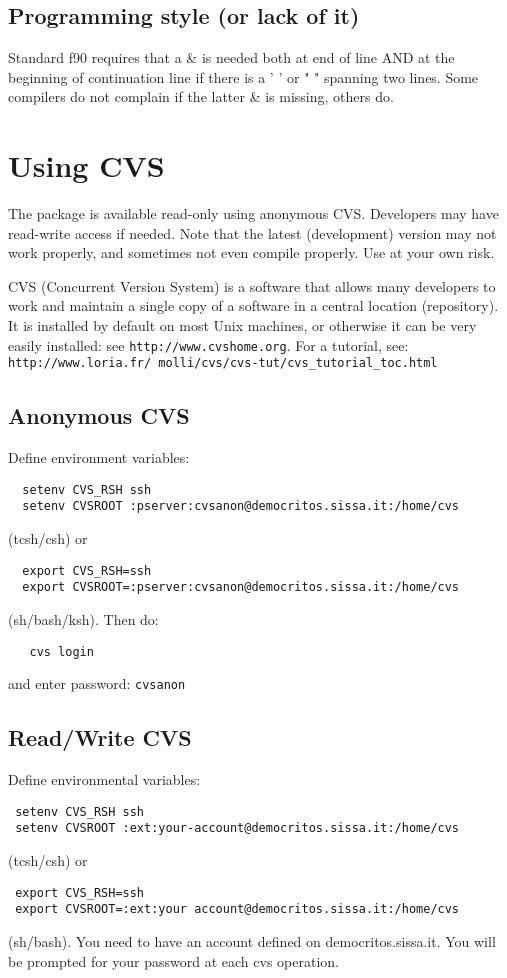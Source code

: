 \documentclass[12pt,a4paper]{article}
\begin{document}
\subsection{Programming style (or lack of it)}

Standard f90 requires that a \& is needed both at end of line 
AND at the beginning of continuation line if there is a ' ' 
or " " spanning two lines. Some compilers do not complain
if the latter \& is missing, others do.

\section{Using CVS}

The package is available read-only using anonymous CVS. Developers 
may have read-write access if needed. Note that the latest
(development) version may not work properly, and sometimes not 
even compile properly. Use at your own risk.

CVS (Concurrent Version System) is a software that allows many
developers to work and maintain a single copy of a software in
a central location (repository). It is installed by default on
most Unix machines, or otherwise it can be very easily installed:
see {\tt http://www.cvshome.org}. For a tutorial, see:\\
{\tt http://www.loria.fr/~{}molli/cvs/cvs-tut/cvs\_tutorial\_toc.html}

\subsection{Anonymous CVS}

Define environment variables:
\begin{verbatim}
  setenv CVS_RSH ssh
  setenv CVSROOT :pserver:cvsanon@democritos.sissa.it:/home/cvs
\end{verbatim}
(tcsh/csh) or
\begin{verbatim}
  export CVS_RSH=ssh
  export CVSROOT=:pserver:cvsanon@democritos.sissa.it:/home/cvs
\end{verbatim}
(sh/bash/ksh). Then do:
\begin{verbatim}
   cvs login
\end{verbatim}
and enter password: \texttt{cvsanon}

\subsection{Read/Write CVS}

Define environmental variables:
\begin{verbatim}
 setenv CVS_RSH ssh
 setenv CVSROOT :ext:your-account@democritos.sissa.it:/home/cvs
\end{verbatim}
(tcsh/csh) or
\begin{verbatim}
 export CVS_RSH=ssh
 export CVSROOT=:ext:your account@democritos.sissa.it:/home/cvs
\end{verbatim}
(sh/bash). You need to have an account defined on democritos.sissa.it.
You will be prompted for your password at each cvs operation.
\end{document}
